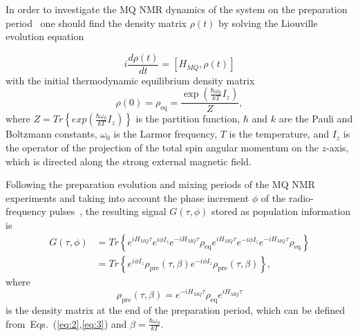 \documentclass[preprint,12pt]{elsarticle}
\begin{document}
In order to investigate the MQ NMR dynamics of the system on the preparation period~\cite{9} one should find the density matrix $\rho(t)$ by solving the Liouville evolution equation~\cite{18}

\begin{equation}
    \label{eq:2}
        i\frac{d\rho(t)}{dt} = [H_{MQ}, \rho(t)]
\end{equation}
with the initial thermodynamic equilibrium density matrix
\begin{equation}
    \label{eq:3}
        \rho(0) = \rho_\mathrm{eq} = \frac{\exp(\frac{\hbar \omega_0}{kT}I_z)}{Z},
\end{equation}
where $Z=Tr \left\{exp\left(\frac{\hbar \omega_0}{kT}I_z\right) \right\}$ is the partition function, $\hbar$ and $k$ are the Pauli and Boltzmann constants, $\omega_0$ is the Larmor frequency, $T$ is the temperature, and $I_z$ is the operator of the projection of the total spin angular momentum on the $z$-axis, which is directed along the strong external magnetic field.


Following the preparation evolution and mixing periods of the MQ NMR experiments and taking into account the phase increment $\phi$ of the radio-frequency pulses~\cite{9}, the resulting signal $G(\tau,\phi)$ stored as population information is
%
\begin{equation} \label{eq:4}
	\begin{split}
		G(\tau,\phi)
		& = Tr \left\{
			e^{iH_{MQ}\tau} e^{i\phi I_z} e^{-iH_{MQ}\tau} \rho_\mathrm{eq}
			e^{iH_{MQ}\tau} e^{-i\phi I_z} e^{-iH_{MQ}\tau}\rho_\mathrm{eq}
		\right\}
		\\
		& = Tr \left\{
			e^{i\phi I_z} \rho_\mathrm{pre}(\tau,\beta)
      e^{-i\phi I_z}\rho_\mathrm{pre}(\tau,\beta)
		\right\},
	\end{split}
\end{equation}
%
where
%
\begin{equation} \label{eq:5}
	\rho_\mathrm{pre}(\tau,\beta) = e^{-iH_{MQ}\tau}\rho_\mathrm{eq}e^{iH_{MQ}\tau}
\end{equation}
%
is the density matrix at the end of the preparation period,
which can be defined from~Eqs.~(\ref{eq:2},\ref{eq:3}) and $\beta = \frac{\hbar \omega_0}{kT}$.
\end{document}
